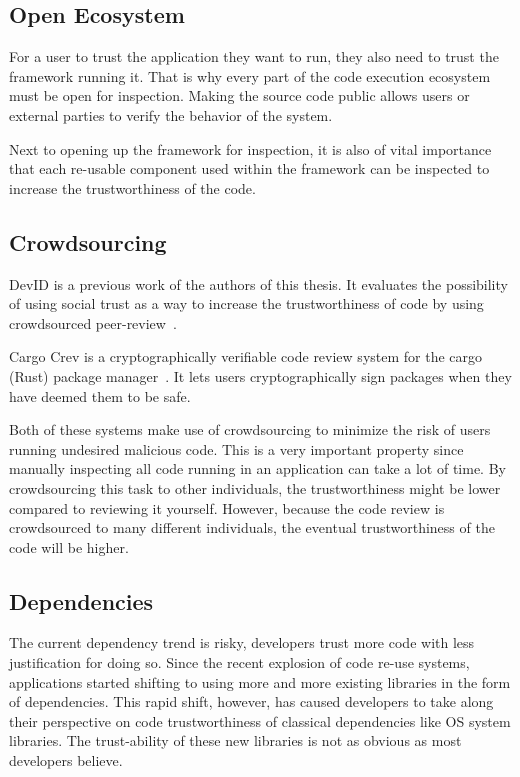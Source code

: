 \subsection*{Open Ecosystem}
For a user to trust the application they want to run, they also need to trust the framework running it. That is why every part of the code execution ecosystem must be open for inspection. Making the source code public allows users or external parties to verify the behavior of the system. 

Next to opening up the framework for inspection, it is also of vital importance that each re-usable component used within the framework can be inspected to increase the trustworthiness of the code.

\subsection*{Crowdsourcing}
DevID is a previous work of the authors of this thesis. It evaluates the possibility of using social trust as a way to increase the trustworthiness of code by using crowdsourced peer-review~\cite{de2019devid}.

Cargo Crev is a cryptographically verifiable code review system for the cargo (Rust) package manager~\cite{cargocrev}. It lets users cryptographically sign packages when they have deemed them to be safe.

Both of these systems make use of crowdsourcing to minimize the risk of users running undesired malicious code. This is a very important property since manually inspecting all code running in an application can take a lot of time. By crowdsourcing this task to other individuals, the trustworthiness might be lower compared to reviewing it yourself. However, because the code review is crowdsourced to many different individuals, the eventual trustworthiness of the code will be higher.

\subsection*{Dependencies}
The current dependency trend is risky, developers trust more code with less justification for doing so. Since the recent explosion of code re-use systems, applications started shifting to using more and more existing libraries in the form of dependencies. This rapid shift, however, has caused developers to take along their perspective on code trustworthiness of classical dependencies like OS system libraries. The trust-ability of these new libraries is not as obvious as most developers believe.

